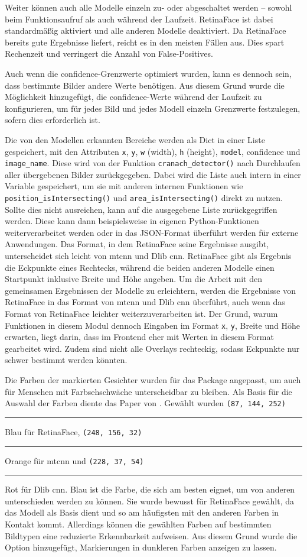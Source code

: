 Weiter können auch alle Modelle einzeln zu- oder abgeschaltet werden – sowohl beim Funktionsaufruf als auch während der Laufzeit. RetinaFace ist dabei standardmäßig aktiviert und alle anderen Modelle deaktiviert. Da RetinaFace bereits gute Ergebnisse liefert, reicht es in den meisten Fällen aus. Dies spart Rechenzeit und verringert die Anzahl von False-Positives.

Auch wenn die \gls{confidence}-Grenzwerte optimiert wurden, kann es dennoch sein, dass bestimmte Bilder andere Werte benötigen. Aus diesem Grund wurde die Möglichkeit hinzugefügt, die \gls{confidence}-Werte während der Laufzeit zu konfigurieren, um für jedes Bild und jedes Modell einzeln Grenzwerte festzulegen, sofern dies erforderlich ist.

Die von den Modellen erkannten Bereiche werden als Dict in einer Liste gespeichert, mit den Attributen \texttt{x}, \texttt{y}, \texttt{w} (width), \texttt{h} (height), \texttt{model}, \gls{confidence} und \texttt{image\_name}. Diese wird von der Funktion \texttt{cranach\_detector()} nach Durchlaufen aller übergebenen Bilder zurückgegeben. Dabei wird die Liste auch intern in einer Variable gespeichert, um sie mit anderen internen Funktionen wie \texttt{position\_isIntersecting()} und \texttt{area\_isIntersecting()} direkt zu nutzen. Sollte dies nicht ausreichen, kann auf die ausgegebene Liste zurückgegriffen werden. Diese kann dann beispielsweise in eigenen Python-Funktionen weiterverarbeitet werden oder in das JSON-Format überführt werden für externe Anwendungen. Das Format, in dem RetinaFace seine Ergebnisse ausgibt, unterscheidet sich leicht von \gls{mtcnn} und Dlib \gls{cnn}. RetinaFace gibt als Ergebnis die Eckpunkte eines Rechtecks, während die beiden anderen Modelle einen Startpunkt inklusive Breite und Höhe angeben. Um die Arbeit mit den gemeinsamen Ergebnissen der Modelle zu erleichtern, werden die Ergebnisse von RetinaFace in das Format von \gls{mtcnn} und Dlib \gls{cnn} überführt, auch wenn das Format von RetinaFace leichter weiterzuverarbeiten ist. Der Grund, warum Funktionen in diesem Modul dennoch Eingaben im Format \texttt{x}, \texttt{y}, Breite und Höhe erwarten, liegt darin, dass im Frontend eher mit Werten in diesem Format gearbeitet wird. Zudem sind nicht alle Overlays rechteckig, sodass Eckpunkte nur schwer bestimmt werden könnten.

Die Farben der markierten Gesichter wurden für das Package angepasst, um auch für Menschen mit Farbsehschwäche unterscheidbar zu bleiben. Als Basis für die Auswahl der Farben diente das Paper von \cite{abs-2107-02270}. Gewählt wurden \texttt{(87, 144, 252)} \textcolor{PetroffBlue}{\rule{1em}{1em}} Blau für RetinaFace, \texttt{(248, 156, 32)} \textcolor{PetroffOrange}{\rule{1em}{1em}} Orange für \gls{mtcnn} und \texttt{(228, 37, 54)} \textcolor{PetroffRed}{\rule{1em}{1em}} Rot für Dlib \gls{cnn}. Blau ist die Farbe, die sich am besten eignet, um von anderen unterschieden werden zu können. Sie wurde bewusst für RetinaFace gewählt, da das Modell als Basis dient und so am häufigsten mit den anderen Farben in Kontakt kommt. Allerdings können die gewählten Farben auf bestimmten Bildtypen eine reduzierte Erkennbarkeit aufweisen. Aus diesem Grund wurde die Option hinzugefügt, Markierungen in dunkleren Farben anzeigen zu lassen.

